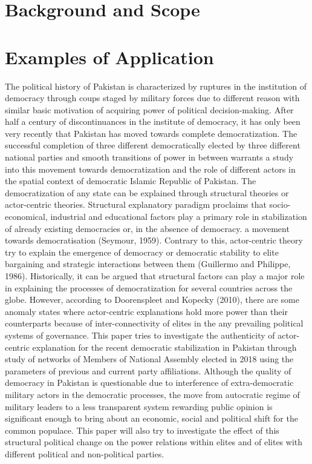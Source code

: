 \documentclass[runningheads]{llncs}
\begin{document}
\section{Background and Scope}

\section{Examples of Application}
The political history of Pakistan is characterized by ruptures in the institution of democracy through coups staged by military forces due to different reason with similar basic motivation of acquiring power of political decision-making. After half a century of discontinuances in the institute of democracy, it has only been very recently that Pakistan has moved towards complete democratization. The successful completion of three different democratically elected by three different national parties and smooth transitions of power in between warrants a study into this movement towards democratization and the role of different actors in the spatial context of democratic Islamic Republic of Pakistan.
\indent
The democratization of any state can be explained through structural theories or actor-centric theories. Structural explanatory paradigm proclaims that socio-economical, industrial and educational factors play a primary role in stabilization of already existing democracies or, in the absence of democracy. a movement towards democratisation (Seymour, 1959). Contrary to this, actor-centric theory try to explain the emergence of democracy or democratic stability to elite bargaining and strategic interactions between them (Guillermo and Philippe, 1986). Historically, it can be argued that structural factors can play a major role in explaining the processes of democratization for several countries across the globe. However, according to Doorenspleet and Kopecky (2010), there are some anomaly states where actor-centric explanations hold more power than their counterparts because of inter-connectivity of elites in the any prevailing political systems of governance.
\indent
This paper tries to investigate the authenticity of actor-centric explanation for the recent democratic stabilization in Pakistan through study of networks of Members of National Assembly elected in 2018 using the parameters of previous and current party affiliations. Although the quality of democracy in Pakistan is questionable due to interference of extra-democratic military actors in the democratic processes, the move from autocratic regime of military leaders to a less transparent system rewarding public opinion is significant enough to bring about an economic, social and political shift for the common populace. This paper will also try to investigate the effect of this structural political change on the power relations within elites and of elites with different political and non-political parties.
\end{document}
